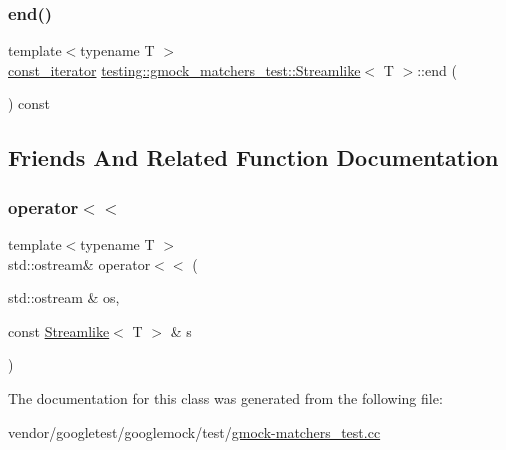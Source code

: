 \subsubsection{\texorpdfstring{end()}{end()}}
{\footnotesize\ttfamily template$<$typename T $>$ \\
\hyperlink{classtesting_1_1gmock__matchers__test_1_1_streamlike_a2eeb61dca56f70d0266f5f8ae91d2c7b}{const\+\_\+iterator} \hyperlink{classtesting_1_1gmock__matchers__test_1_1_streamlike}{testing\+::gmock\+\_\+matchers\+\_\+test\+::\+Streamlike}$<$ T $>$\+::end (\begin{DoxyParamCaption}{ }\end{DoxyParamCaption}) const\hspace{0.3cm}{\ttfamily [inline]}}



\subsection{Friends And Related Function Documentation}
\mbox{\label{classtesting_1_1gmock__matchers__test_1_1_streamlike_a4b45ba8c2a5ee61697003f02568df91f}} 
\subsubsection{\texorpdfstring{operator$<$$<$}{operator<<}}
{\footnotesize\ttfamily template$<$typename T $>$ \\
std\+::ostream\& operator$<$$<$ (\begin{DoxyParamCaption}\item[{std\+::ostream \&}]{os,  }\item[{const \hyperlink{classtesting_1_1gmock__matchers__test_1_1_streamlike}{Streamlike}$<$ T $>$ \&}]{s }\end{DoxyParamCaption})\hspace{0.3cm}{\ttfamily [friend]}}



The documentation for this class was generated from the following file\+:\begin{DoxyCompactItemize}
\item 
vendor/googletest/googlemock/test/\hyperlink{gmock-matchers__test_8cc}{gmock-\/matchers\+\_\+test.\+cc}\end{DoxyCompactItemize}
